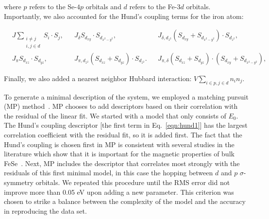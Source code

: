 where $p$ refers to the Se-$4p$ orbitals and $d$ refers to the Fe-$3d$ orbitals. 
Importantly, we also accounted for the Hund's coupling terms for the iron atom:

\begin{align}
  &J \sum_{\substack{i\ne j \\i,j \in d}} S_i \cdot S_j,&
  &J_{\delta} S_{d_{xy}} \cdot S_{d_{x^2-y^2}},&
  &J_{\delta,d_{z^2}} (S_{d_{xy}} + S_{d_{x^2-y^2}}) \cdot S_{d_{z^2}},& \label{eqn:hund1}
  \nonumber \\
  &J_{\pi} S_{d_{xz}} \cdot S_{d_{yz}},&
  &J_{\pi,d_{z^2}} (S_{d_{xz}} + S_{d_{yz}}) \cdot S_{d_{z^2}}.&
  &J_{\pi,\delta} (S_{d_{xz}} + S_{d_{yz}}) \cdot (S_{d_{xy}} + S_{d_{x^2-y^2}}),&
\end{align}

Finally, we also added a nearest neighbor Hubbard interaction: $V \sum_{i\in p, j\in d} n_{i} n_j$.

To generate a minimal description of the system, we employed a matching pursuit (MP) method~\cite{MP_Zhang1993}.
MP chooses to add descriptors based on their correlation with the residual of the linear fit. 
We started with a model that only consists of $E_0$. The Hund's coupling descriptor [the first term in Eq.~\eqref{eqn:hund1}]
has the largest correlation coefficient with the residual fit, so it is added first. The fact that the Hund's coupling is chosen first in MP 
is consistent with several studies in the literature which show that it is important for the magnetic properties of bulk FeSe~\cite{demedici_hunds_2011,de_medici_janus-faced_2011,georges_strong_2013,busemeyer_competing_2016}. 
Next, MP includes the descriptor that correlates most strongly with the residuals of this first minimal model, in this case the hopping between $d$ and $p$ $\sigma$-symmetry orbitals. 
We repeated this procedure until the RMS error did not improve more than 0.05 eV upon adding a new parameter.
This criterion was chosen to strike a balance between the complexity of the model and the accuracy in reproducing the data set.

